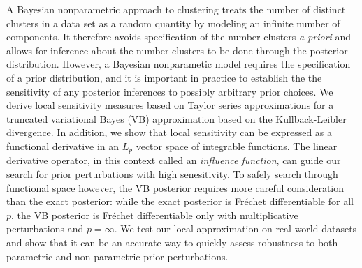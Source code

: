 A Bayesian nonparametric approach to clustering treats the number of distinct
clusters in a data set as a random quantity by modeling an infinite number
of components.  It therefore avoids specification of the number
clusters \textit{a priori} and allows for inference about the number clusters
to be done through the posterior distribution.
However, a Bayesian nonparametic model requires the specification of a
prior distribution, and it is important in practice to establish the the sensitivity
of any posterior inferences to possibly arbitrary prior choices.
We derive local sensitivity measures based on Taylor series approximations for a
truncated variational Bayes (VB) approximation based on the Kullback-Leibler
divergence.
In addition, we show that local sensitivity can be expressed as
a functional derivative in an $L_p$ vector space of integrable functions.
The linear derivative operator, in this context called an \textit{influence function},
can guide our search for prior perturbations with high senesitivity.
To safely search through functional space however, the
VB posterior requires more careful consideration than the exact posterior:
while the exact posterior is Fr{\'e}chet differentiable for all $p$,
the VB posterior is Fr{\'e}chet differentiable
only with multiplicative perturbations and $p=\infty$.
We test our local approximation on real-world datasets and show that
it can be an accurate way to quickly assess
robustness to both parametric and non-parametric prior perturbations.


